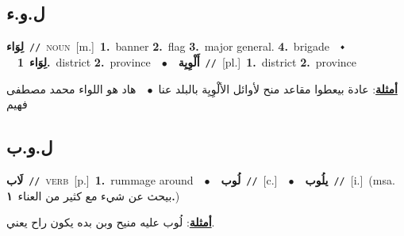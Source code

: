 \documentclass[10pt,a4paper,twoside]{article} %
\begin{document}
\begin{multicols}{2}
\vspace{-3mm}
\subsection*{\color{blue}\foreignlanguage{arabic}{ل.و.ء}\color{blue}{}} 

{\setlength\topsep{0pt}\textbf{\foreignlanguage{arabic}{لِوَاء}}\ {\color{gray}\texttt{//}\color{black}}\ \textsc{noun}\ [m.]\ \textbf{1.}~banner  \textbf{2.}~flag  \textbf{3.}~major general.  \textbf{4.}~brigade\ \ $\smblkdiamond$\ \ \setlength\topsep{0pt}\textbf{\foreignlanguage{arabic}{لِوَاء}}\ \textbf{1.}~district  \textbf{2.}~province\ \ $\bullet$\ \ \setlength\topsep{0pt}\textbf{\foreignlanguage{arabic}{أَلْوِيِة}}\ {\color{gray}\texttt{//}\color{black}}\ [pl.]\ \textbf{1.}~district  \textbf{2.}~province\  \begin{flushright}\color{gray}\foreignlanguage{arabic}{\textbf{\underline{\foreignlanguage{arabic}{أمثلة}}}: عادة بيعطوا مقاعد منح لأوائل الألْوِيِة بالبلد عنا\ $\bullet$\ \  هاد هو اللواء محمد مصطفى فهيم}\end{flushright}\color{black}} \vspace{2mm}

\vspace{-3mm}
\subsection*{\color{blue}\foreignlanguage{arabic}{ل.و.ب}\color{blue}{}} 

{\setlength\topsep{0pt}\textbf{\foreignlanguage{arabic}{لَاب}}\ {\color{gray}\texttt{//}\color{black}}\ \textsc{verb}\ [p.]\ \textbf{1.}~rummage around\ \ $\bullet$\ \ \setlength\topsep{0pt}\textbf{\foreignlanguage{arabic}{لُوب}}\ {\color{gray}\texttt{//}\color{black}}\ [c.]\ \ $\bullet$\ \ \setlength\topsep{0pt}\textbf{\foreignlanguage{arabic}{يلُوب}}\ {\color{gray}\texttt{//}\color{black}}\ [i.]\ \color{gray}(msa. \foreignlanguage{arabic}{بيحث عن شيء مع كثير من العناء}~\foreignlanguage{arabic}{\textbf{١.}})\color{black}\  \begin{flushright}\color{gray}\foreignlanguage{arabic}{\textbf{\underline{\foreignlanguage{arabic}{أمثلة}}}: لُوب عليه منيح وبن بده يكون راح يعني.}\end{flushright}\color{black}} \vspace{2mm}


\end{multicols}
\end{document}
